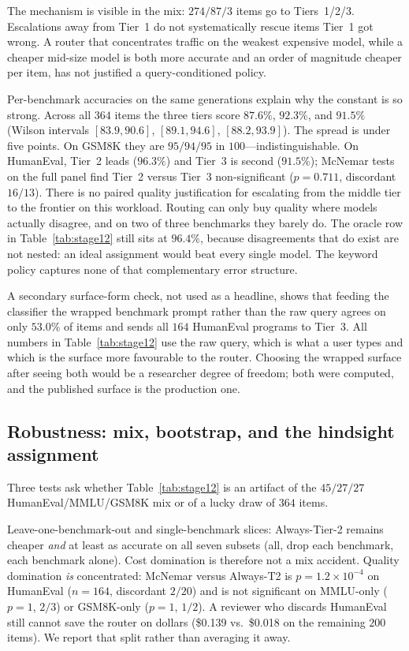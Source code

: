 \documentclass[a4paper,twoside]{article}
\begin{document}
The mechanism is visible in the mix: $274/87/3$ items go to Tiers~1/2/3. Escalations away from Tier~1 do not systematically rescue items Tier~1 got wrong. A router that concentrates traffic on the weakest expensive model, while a cheaper mid-size model is both more accurate and an order of magnitude cheaper per item, has not justified a query-conditioned policy.

Per-benchmark accuracies on the same generations explain why the constant is so strong. Across all $364$ items the three tiers score $87.6\%$, $92.3\%$, and $91.5\%$ (Wilson intervals $[83.9,90.6]$, $[89.1,94.6]$, $[88.2,93.9]$). The spread is under five points. On GSM8K they are $95/94/95$ in $100$---indistinguishable. On HumanEval, Tier~2 leads ($96.3\%$) and Tier~3 is second ($91.5\%$); McNemar tests on the full panel find Tier~2 versus Tier~3 non-significant ($p=0.711$, discordant $16/13$). There is no paired quality justification for escalating from the middle tier to the frontier on this workload. Routing can only buy quality where models actually disagree, and on two of three benchmarks they barely do. The oracle row in Table~\ref{tab:stage12} still sits at $96.4\%$, because disagreements that do exist are not nested: an ideal assignment would beat every single model. The keyword policy captures none of that complementary error structure.

A secondary surface-form check, not used as a headline, shows that feeding the classifier the wrapped benchmark prompt rather than the raw query agrees on only $53.0\%$ of items and sends all $164$ HumanEval programs to Tier~3. All numbers in Table~\ref{tab:stage12} use the raw query, which is what a user types and which is the surface more favourable to the router. Choosing the wrapped surface after seeing both would be a researcher degree of freedom; both were computed, and the published surface is the production one.

\subsection{Robustness: mix, bootstrap, and the hindsight assignment}
\label{sec:robustA}

Three tests ask whether Table~\ref{tab:stage12} is an artifact of the $45/27/27$ HumanEval/MMLU/GSM8K mix or of a lucky draw of $364$ items.

Leave-one-benchmark-out and single-benchmark slices: Always-Tier-2 remains cheaper \emph{and} at least as accurate on all seven subsets (all, drop each benchmark, each benchmark alone). Cost domination is therefore not a mix accident. Quality domination \emph{is} concentrated: McNemar versus Always-T2 is $p=1.2\times 10^{-4}$ on HumanEval ($n=164$, discordant $2/20$) and is not significant on MMLU-only ($p=1$, $2/3$) or GSM8K-only ($p=1$, $1/2$). A reviewer who discards HumanEval still cannot save the router on dollars (\$0.139 vs.\ \$0.018 on the remaining $200$ items). We report that split rather than averaging it away.
\end{document}
